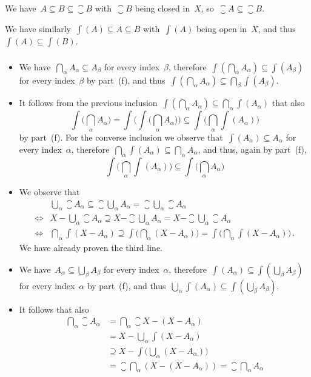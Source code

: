 We have~$A ⊆ B ⊆ \closure{B}$ with~$\closure{B}$ being closed in~$X$, so~$\closure{A} ⊆ \closure{B}$.

We have similarly~$\int(A) ⊆ A ⊆ B$ with~$\int(A)$ being open in~$X$, and thus~$\int(A) ⊆ \int(B)$.



\addtocounter{subsubsection}{-2}
\subsubsection{}

\begin{itemize}

	\item
		We have~$⋂_α A_α ⊆ A_β$ for every index~$β$, therefore~$\int(⋂_α A_α) ⊆ \int(A_β)$ for every index~$β$ by part~(f), and thus~$\int(⋂_α A_α) ⊆ ⋂_β \int(A_β)$.

	\item
		It follows from the previous inclusion~$\int(⋂_α A_α) ⊆ ⋂_α \int(A_α)$ that also
		\[
			\int\biggl( ⋂_α A_α \biggr)
			=
			\int\biggl( \int\biggl( ⋂_α A_α \biggr) \biggr)
			⊆
			\int\biggl( ⋂_α \int(A_α) \biggr)
		\]
		by part~(f).
		For the converse inclusion we observe that~$\int(A_α) ⊆ A_α$ for every index~$α$, therefore~$⋂_α \int(A_α) ⊆ ⋂_α A_α$, and thus, again by part~(f),
		\[
			\int\biggl( ⋂_α \int(A_α) \biggr) ⊆ \int\biggl( ⋂_α A_α \biggr)
		\]

	\item
		We observe that
		\begin{align*}
			{}&
			⋃_α \closure{A_α}
			⊆ \closure{ ⋃_α A_α }
			= \closure{ ⋃_α \closure{A_α} } \\
			\iff{}&
			X - ⋃_α \closure{A_α}
			⊇ X - \closure{ ⋃_α A_α }
			= X - \closure{ ⋃_α \closure{A_α} } \\
			\iff{}&
			⋂_α \int(X - A_α)
			⊇ \int\biggl( ⋂_α {} (X - A_α) \biggr)
			= \int\biggl( ⋂_α \int(X - A_α) \biggr) \,.
		\end{align*}
		We have already proven the third line.

	\item
		We have~$A_α ⊆ ⋃_β A_β$ for every index~$α$, therefore~$\int(A_α) ⊆ \int(⋃_β A_β)$ for every index~$α$ by part~(f), and thus~$⋃_α \int(A_α) ⊆ \int(⋃_β A_β)$.

	\item
		It follows that also
		\begin{align*}
			⋂_α \closure{A_α}
			&=
			⋂_α \closure{X - (X - A_α)} \\
			&=
			X - ⋃_α \int(X - A_α) \\
			&⊇
			X - \int\biggl(⋃_α {} (X - A_α)\biggr) \\
			&=
			\closure{⋂_α {} (X - (X - A_α))}
			=
			\closure{⋂_α A_α}
		\end{align*}

\end{itemize}
